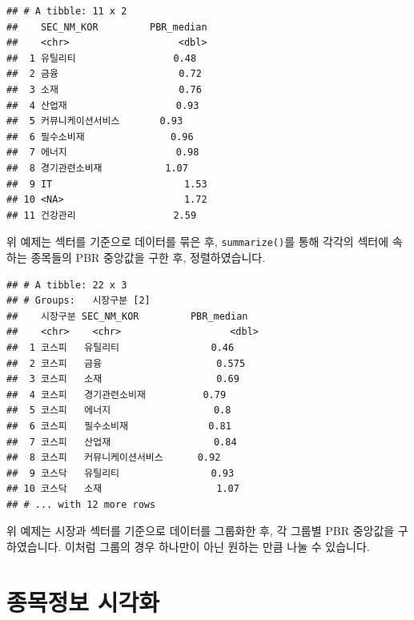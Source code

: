 \documentclass[12pt,]{book}
\newenvironment{Shaded}{\begin{snugshade}}{\end{snugshade}}
\newcommand{\DataTypeTok}[1]{\textcolor[rgb]{0.13,0.29,0.53}{#1}}
\newcommand{\KeywordTok}[1]{\textcolor[rgb]{0.13,0.29,0.53}{\textbf{#1}}}
\newcommand{\NormalTok}[1]{#1}
\newcommand{\OperatorTok}[1]{\textcolor[rgb]{0.81,0.36,0.00}{\textbf{#1}}}
\newcommand{\OtherTok}[1]{\textcolor[rgb]{0.56,0.35,0.01}{#1}}
\newcommand{\StringTok}[1]{\textcolor[rgb]{0.31,0.60,0.02}{#1}}
\begin{document}
\begin{verbatim}
## # A tibble: 11 x 2
##    SEC_NM_KOR         PBR_median
##    <chr>                   <dbl>
##  1 유틸리티                 0.48
##  2 금융                     0.72
##  3 소재                     0.76
##  4 산업재                   0.93
##  5 커뮤니케이션서비스       0.93
##  6 필수소비재               0.96
##  7 에너지                   0.98
##  8 경기관련소비재           1.07
##  9 IT                       1.53
## 10 <NA>                     1.72
## 11 건강관리                 2.59
\end{verbatim}

위 예제는 섹터를 기준으로 데이터를 묶은 후, \texttt{summarize()}를 통해 각각의 섹터에 속하는 종목들의 PBR 중앙값을 구한 후, 정렬하였습니다.

\begin{Shaded}
\end{Shaded}

\begin{verbatim}
## # A tibble: 22 x 3
## # Groups:   시장구분 [2]
##    시장구분 SEC_NM_KOR         PBR_median
##    <chr>    <chr>                   <dbl>
##  1 코스피   유틸리티                0.46 
##  2 코스피   금융                    0.575
##  3 코스피   소재                    0.69 
##  4 코스피   경기관련소비재          0.79 
##  5 코스피   에너지                  0.8  
##  6 코스피   필수소비재              0.81 
##  7 코스피   산업재                  0.84 
##  8 코스피   커뮤니케이션서비스      0.92 
##  9 코스닥   유틸리티                0.93 
## 10 코스닥   소재                    1.07 
## # ... with 12 more rows
\end{verbatim}

위 예제는 시장과 섹터를 기준으로 데이터를 그룹화한 후, 각 그룹별 PBR 중앙값을 구하였습니다. 이처럼 그룹의 경우 하나만이 아닌 원하는 만큼 나눌 수 있습니다.

\hypertarget{section-40}{%
\section{종목정보 시각화}\label{section-40}}
\end{document}
